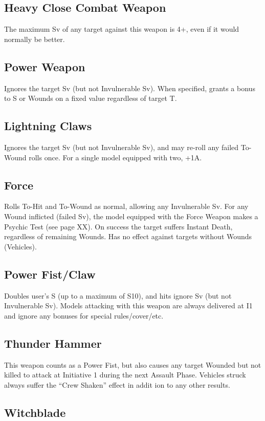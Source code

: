 \subsection{Heavy Close Combat Weapon}
The maximum Sv of any target against this weapon is 4+,
even if it would normally
 be better.
\subsection{Power Weapon}
Ignores the target Sv (but not Invulnerable Sv). When
specified, grants a bonus to S or Wounds on a fixed value
regardless of target T.

\subsection{Lightning Claws}
Ignores the target Sv (but not Invulnerable Sv), and may re-roll
any failed To-Wound rolls once. For a single model equipped
with two, +1A.

\subsection{Force}
Rolls To-Hit and To-Wound as normal, allowing any
Invulnerable Sv. For any Wound inflicted (failed Sv), the model
equipped with the Force Weapon makes a Psychic Test (see
page XX). On success the target suffers Instant Death,
regardless of remaining Wounds. Has no effect against targets
without Wounds (Vehicles).

\subsection{Power Fist/Claw}
Doubles user’s S (up to a maximum of S10), and hits ignore
Sv (but not Invulnerable Sv). Models attacking with this
weapon are always delivered at I1 and ignore any bonuses for
special rules/cover/etc.

\subsection{Thunder Hammer}
This weapon counts as a Power Fist, but also causes any
target Wounded but not killed to attack at Initiative 1 during the
next Assault Phase. Vehicles struck always suffer the “Crew
Shaken” effect in addit
ion to any other results.
\subsection{Witchblade}

